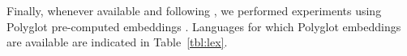 \documentclass[11pt,letterpaper]{article}
\begin{document}
Finally, whenever available and following \citet{plank16}, we performed experiments using Polyglot pre-computed
embeddings \cite{alrfou13}. Languages for which Polyglot embeddings are available are indicated in Table~\ref{tbl:lex}.

\addtocounter{footnote}{-1}

\end{document}
